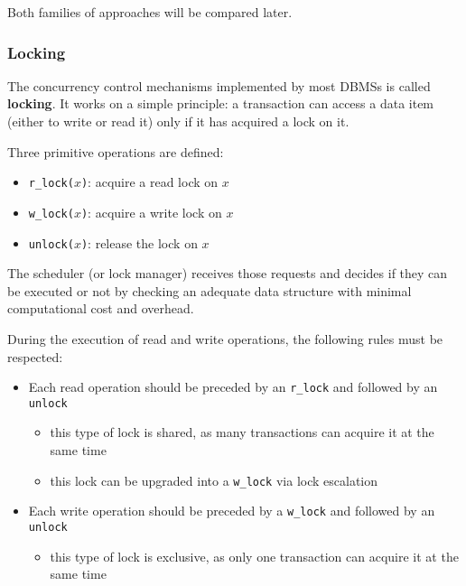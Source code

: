 \documentclass[english]{article}
\begin{document}
Both families of approaches will be compared later.

\subsubsection{Locking}

The concurrency control mechanisms implemented by most DBMSs is called \textbf{locking}.
It works on a simple principle: a transaction can access a data item (either to write or read it) only if it has acquired a lock on it.

Three primitive operations are defined:

\begin{itemize}
  \item \texttt{r\_lock(\(x\))}: acquire a read lock on \(x\)
  \item \texttt{w\_lock(\(x\))}: acquire a write lock on \(x\)
  \item \texttt{unlock(\(x\))}: release the lock on \(x\)
\end{itemize}

The scheduler (or lock manager) receives those requests and decides if they can be executed or not by checking an adequate data structure with minimal computational cost and overhead.

During the execution of read and write operations, the following rules must be respected:

\begin{itemize}
  \item Each read operation should be preceded by an \texttt{r\_lock} and followed by an \texttt{unlock}
        \begin{itemize}
          \item this type of lock is shared, as many transactions can acquire it at the same time
          \item this lock can be upgraded into a \texttt{w\_lock} via lock escalation
        \end{itemize}
  \item Each write operation should be preceded by a \texttt{w\_lock} and followed by an \texttt{unlock}
        \begin{itemize}
          \item this type of lock is exclusive, as only one transaction can acquire it at the same time
        \end{itemize}
\end{itemize}
\end{document}
